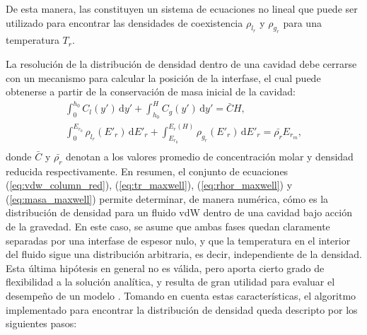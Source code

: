 De esta manera, las  constituyen un sistema de ecuaciones no lineal que puede ser utilizado para encontrar las densidades de coexistencia $\rho_{l_r}$ y $\rho_{g_r}$ para una temperatura $T_r$.

La resoluci\'on de la distribuci\'on de densidad dentro de una cavidad debe cerrarse con un mecanismo para calcular la posici\'on de la interfase, el cual puede obtenerse a partir de la conservaci\'on de masa inicial de la cavidad:
\begin{equation}
	\begin{gathered}
		\int_{0}^{h_0} C_l(y') \, \mbox{d}y' + \int_{h_0}^{H} C_g(y') \, \mbox{d}y' = \bar{C}H ,\\[3mm]
		\int_{0}^{E_{r_0}} \rho_{l_r} (E'_r) \, \mbox{d}E'_r + \int_{E_{r_0}}^{E_r(H)} \rho_{g_r}(E'_r) \, \mbox{d}E'_r = \bar{\rho_r}E_{r_m}, \\
	\end{gathered}
	\label{eq:masa_maxwell}
\end{equation}
donde $\bar{C}$ y $\bar{\rho_r}$ denotan a los valores promedio de concentraci\'on molar y densidad reducida respectivamente. En resumen, el conjunto de ecuaciones (\ref{eq:vdw_column_red}), (\ref{eq:tr_maxwell}), (\ref{eq:rhor_maxwell}) y (\ref{eq:masa_maxwell}) permite determinar, de manera num\'erica, c\'omo es la distribuci\'on de densidad para un fluido vdW dentro de una cavidad  bajo acci\'on de la gravedad. En este caso, se asume que ambas fases quedan claramente separadas por una interfase de espesor nulo, y que la temperatura en el interior del fluido sigue una distribuci\'on arbitraria, es decir, independiente de la densidad.  Esta \'ultima hip\'otesis en general no es v\'alida, pero aporta cierto grado de flexibilidad a la soluci\'on anal\'itica, y resulta de gran utilidad para evaluar el desempe\~no de un modelo \pp{}. Tomando en cuenta estas caracter\'isticas, el algoritmo implementado para encontrar la distribuci\'on de densidad queda descripto por los siguientes pasos:

